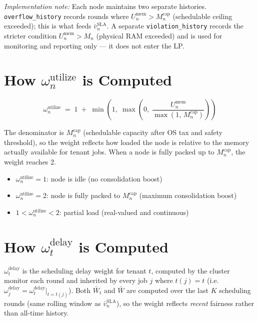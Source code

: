 \documentclass[11pt]{article}
\newcommand{\vbarsla}{\bar{v}_n^{\text{SLA}}}
\newcommand{\Mcap}{M_n^{\text{cap}}}
\newcommand{\omutilize}{\omega_n^{\text{utilize}}}
\newcommand{\Umem}{U_n^{\text{mem}}}
\newcommand{\omdelay}{\omega_j^{\text{delay}}}
\newcommand{\omdelayt}{\omega_t^{\text{delay}}}
\begin{document}
\textit{Implementation note:} Each node maintains two separate histories.
\texttt{overflow\_history} records rounds where $\Umem > \Mcap$ (schedulable
ceiling exceeded); this is what feeds $\vbarsla$. A separate
\texttt{violation\_history} records the stricter condition $\Umem > M_n$
(physical RAM exceeded) and is used for monitoring and reporting only --- it
does not enter the LP.

\section{How $\omutilize$ is Computed}
\label{app:umem}

\[
  \omutilize \;=\; 1 \;+\; \min\!\left(1,\;\max\!\left(0,\;
    \frac{\Umem}{\max\!\left(1,\, \Mcap\right)}\right)\right)
\]

The denominator is $\Mcap$ (schedulable capacity after OS tax and safety
threshold), so the weight reflects how loaded the node is relative to the
memory actually available for tenant jobs. When a node is fully packed up to
$\Mcap$, the weight reaches 2.

\begin{itemize}[noitemsep, topsep=4pt]
  \item $\omutilize = 1$: node is idle (no consolidation boost)
  \item $\omutilize = 2$: node is fully packed to $\Mcap$ (maximum consolidation boost)
  \item $1 < \omutilize < 2$: partial load (real-valued and continuous)
\end{itemize}

\section{How $\omdelayt$ is Computed}
\label{app:omega}

$\omdelayt$ is the scheduling delay weight for tenant $t$, computed by the
cluster monitor each round and inherited by every job $j$ where $t(j) = t$
(i.e.\ $\omdelay = \omdelayt\big|_{t=t(j)}$). Both $\bar{W}_t$ and $\bar{W}$
are computed over the last $K$ scheduling rounds (same rolling window as
$\vbarsla$), so the weight reflects \emph{recent} fairness rather than
all-time history.
\end{document}
